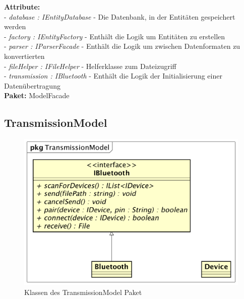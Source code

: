 \documentclass[a4paper]{scrreprt}
\begin{document}
\textbf{Attribute:}\\
- \textit{database : IEntityDatabase} - Die Datenbank, in der Entitäten gespeichert werden\\
- \textit{factory : IEntityFactory} - Enthält die Logik um Entitäten zu erstellen\\
- \textit{parser : IParserFacade} - Enthält die Logik um zwischen Datenformaten zu konvertierten\\
- \textit{fileHelper : IFileHelper} - Helferklasse zum Dateizugriff\\
- \textit{transmission : IBluetooth} - Enthält die Logik der Initialisierung einer Datenübertragung\\

\textbf{Paket:} ModelFacade

\subsection{TransmissionModel}
\begin{figure}[H]
\centering
\includegraphics[width=0.75\textheight]{graphics/Klassendiagramme/Model/TransmissionModelPackage.png}
\caption{Klassen des TransmissionModel Paket}
\end{figure}
\end{document}

